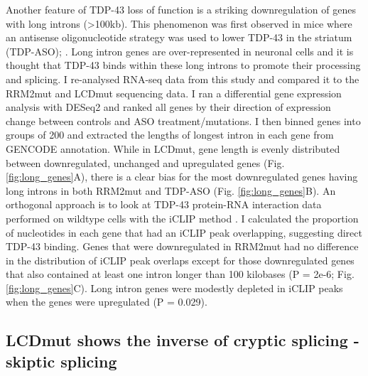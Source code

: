 Another feature of TDP-43 loss of function is a striking downregulation of genes with long introns (>100kb). This phenomenon was first observed in mice where an antisense oligonucleotide strategy was used to lower TDP-43 in the striatum (TDP-ASO); \citep{Polymenidou2011-hs}. Long intron genes are over-represented in neuronal cells \citep{Sibley2015} and it is thought that TDP-43 binds within these long introns to promote their processing and splicing. I re-analysed RNA-seq data from this study and compared it to the RRM2mut and LCDmut sequencing data. I ran a differential gene expression analysis with DESeq2 and ranked all genes by their direction of expression change between controls and ASO treatment/mutations. I then binned genes into groups of 200 and extracted the lengths of longest intron in each gene from GENCODE annotation. While in LCDmut, gene length is evenly distributed between downregulated, unchanged and upregulated genes (Fig. \ref{fig:long_genes}A), there is a clear bias for the most downregulated genes having long introns in both RRM2mut and TDP-ASO (Fig. \ref{fig:long_genes}B). An orthogonal approach is to look at TDP-43 protein-RNA interaction data performed on wildtype cells with the iCLIP method \citep{Huppertz2014-ip}. I calculated the proportion of nucleotides in each gene that had an iCLIP peak overlapping, suggesting direct TDP-43 binding. Genes that were downregulated in RRM2mut had no difference in the distribution of iCLIP peak overlaps except for those downregulated genes that also contained at least one intron longer than 100 kilobases (P = 2e-6; Fig. \ref{fig:long_genes}C). Long intron genes were modestly depleted in iCLIP peaks when the genes were upregulated (P = 0.029).


\subsection{LCDmut shows the inverse of cryptic splicing - skiptic splicing}

